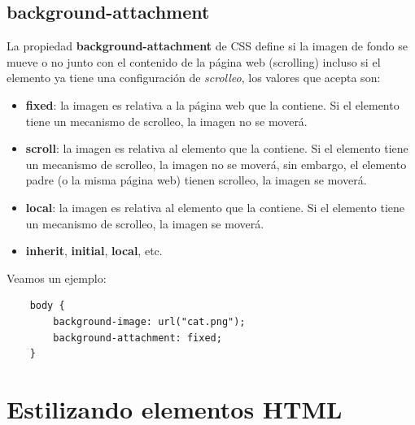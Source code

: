 \subsection{background-attachment}

La propiedad \textbf{background-attachment} de CSS define si la imagen de fondo se mueve o no junto con el contenido de la página web (scrolling) incluso si el elemento ya tiene una configuración de \textit{scrolleo}, los valores que acepta son:
\begin{itemize}
    \item \textbf{fixed}: la imagen es relativa a la página web que la contiene. Si el elemento tiene un mecanismo de scrolleo, la imagen no se moverá.
    \item \textbf{scroll}: la imagen es relativa al elemento que la contiene. Si el elemento tiene un mecanismo de scrolleo, la imagen no se moverá, sin embargo, el elemento padre (o la misma página web) tienen scrolleo, la imagen se moverá.
    \item \textbf{local}: la imagen es relativa al elemento que la contiene. Si el elemento tiene un mecanismo de scrolleo, la imagen se moverá.
    \item \textbf{inherit}, \textbf{initial}, \textbf{local}, etc.
\end{itemize}

Veamos un ejemplo:
\begin{lstlisting}
    body {
        background-image: url("cat.png");
        background-attachment: fixed;
    }
\end{lstlisting}



\section{Estilizando elementos HTML}


